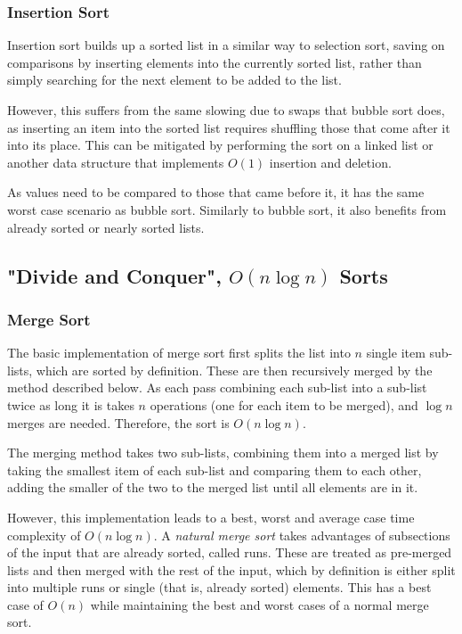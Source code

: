 \documentclass[]{article}
\begin{document}
\subsubsection{Insertion Sort}

Insertion sort builds up a sorted list in a similar way to selection sort, saving on comparisons by inserting elements into the currently sorted list, rather than simply searching for the next element to be added to the list.

However, this suffers from the same slowing due to swaps that bubble sort does, as inserting an item into the sorted list requires shuffling those that come after it into its place. This can be mitigated by performing the sort on a linked list or another data structure that implements $O(1)$ insertion and deletion.

As values need to be compared to those that came before it, it has the same worst case scenario as bubble sort. Similarly to bubble sort, it also benefits from already sorted or nearly sorted lists.

\pagebreak

\subsection{"Divide and Conquer", $O(n\log{n})$ Sorts}

\subsubsection{Merge Sort}

The basic implementation of merge sort first splits the list into $n$ single item sub-lists, which are sorted by definition. These are then recursively merged by the method described below. As each pass combining each sub-list into a sub-list twice as long it is takes $n$ operations (one for each item to be merged), and $\log{n}$ merges are needed. Therefore, the sort is $O(n\log{n}) $.

The merging method takes two sub-lists, combining them into a merged list by taking the smallest item of each sub-list and comparing them to each other, adding the smaller of the two to the merged list until all elements are in it.

However, this implementation leads to a best, worst and average case time complexity of $O(n\log{n})$. A \emph{natural merge sort} takes advantages of subsections of the input that are already sorted, called runs. These are treated as pre-merged lists and then merged with the rest of the input, which by definition is either split into multiple runs or single (that is, already sorted) elements. This has a best case of $O(n)$ while maintaining the best and worst cases of a normal merge sort.
\end{document}
